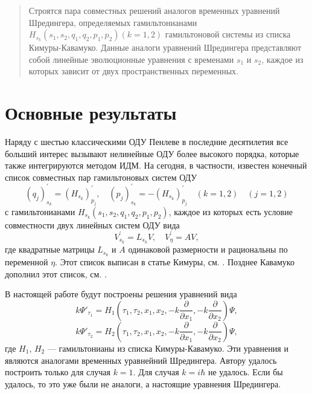 
\maketitle

\begin{abstract}
Строятся пара совместных решений аналогов временных уравнений
Шредингера, определяемых гамильтонианами  $H_{s_k}(s_1,s_2,q_1,q_2,p_1,p_2) (k=1,2)$ гамильтоновой системы из списка Кимуры-Кавамуко. 
Данные аналоги уравнений Шредингера представляют собой линейные эволюционные уравнения с временами $s_1$ и $s_2$, 
каждое из которых зависит от двух пространственных переменных.

\end{abstract}

\section{Основные результаты} %

Наряду  с шестью классическими ОДУ Пенлеве в последние десятилетия все больший интерес вызывают 
нелинейные ОДУ более высокого порядка, которые также интегрируются методом ИДМ. На сегодня, 
в частности, известен конечный список совместных пар гамильтоновых систем ОДУ 
\[
(q_j)^\prime_{s_k}=(H_{s_k})^\prime_{p_j}, \quad 
(p_j)^\prime_{s_k}=-(H_{s_k})^\prime_{p_j}\quad (k=1,2)\quad (j=1,2)
\]
с гамильтонианами $H_{s_k}(s_1,s_2,q_1,q_2,p_1,p_2)$, каждое из которых есть условие совместности
двух линейных систем ОДУ вида 
\[
V^{\prime}_{s_k}=L_{s_k}V,\quad 
V^\prime_{\eta}=AV,
\]
где квадратные матрицы $L_{s_k}$ и $A$ одинаковой размерности и рациональны по переменной $\eta$. 
Этот список выписан в статье Кимуры, см. \cite{Kim}. Позднее Кавамуко дополнил этот список, см. \cite{Kaw}. 

В настоящей работе будут построены решения уравнений вида
\[
k\Psi'_{\tau_1}=H_1(\tau_1,\tau_2,x_1,x_2,-k\frac{\partial}{\partial x_1}, -k\frac{\partial}{\partial x_2})\Psi,
\]
\[
k\Psi'_{\tau_2}=H_2(\tau_1,\tau_2,x_1,x_2,-k\frac{\partial}{\partial x_1}, -k\frac{\partial}{\partial x_2})\Psi,
\]
где $H_1$, $H_2$ --- гамильтонианы из списка Кимуры-Кавамуко. 
Эти уравнения и являются аналогами временных уравнейний Шредингера. Автору удалось построить только для случая $k=1$. 
Для случая $k=i\hbar$ не удалось. Если бы удалось, то это уже были не аналоги, а настоящие уравнения Шредингера. 


